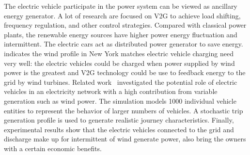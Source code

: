 The electric vehicle participate in the power system can be viewed as ancillary energy generator. 
A lot of research are focused on V2G to achieve load shifting, frequency regulation, and other control
strategies. 
Compared with classical power plants, the renewable energy sources have higher power energy fluctuation and intermittent.
The electric cars act as distributed power generator to save energy.~\cite{YC_newyork} indicates the wind profile in New York matches electric vehicle charging need very well: the electric vehicles could be charged when power supplied by wind power is the greatest and V2G technology could be use to feedback energy to the grid by wind turbines.
Related work~\cite{YC_DRUITT2012104} investigated the potential role of electric vehicles in an electricity network with a high contribution from variable generation such as wind power. The simulation models 1000 individual vehicle entities to represent the behavior of larger numbers of vehicles. 
A stochastic trip generation profile is used to generate realistic journey characteristics. 
Finally, experimental results show that the electric vehicles connected to the grid and discharge make up for intermittent of wind generate power, also bring the owners with a certain economic benefits.



